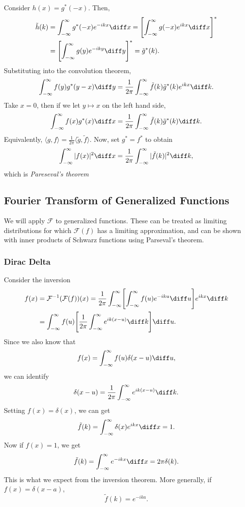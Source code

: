 \documentclass[12pt]{article}
\begin{document}
Consider $h(x) = g^{\ast}(-x)$. Then,
\begin{align*}
	\tilde h(k) &= \int_{-\infty}^{\infty} g^{\ast}(-x) e^{-ikx}\diff x = \Biggl[ \int_{-\infty}^{\infty} g(-x) e^{ikx} \diff x \Biggr]^{\ast} \\
		    &= \Biggl[ \int_{-\infty}^{\infty} g(y) e^{-iky} \diff y \Biggr]^{\ast} = \tilde g^{\ast}(k).
\end{align*}
Substituting into the convolution theorem,
\[
	\int_{-\infty}^{\infty} f(y) g^{\ast}(y - x) \diff y = \frac{1}{2\pi} \int_{-\infty}^{\infty} \tilde f(k) \tilde g^{\ast}(k) e^{ikx} \diff k
.\]
Take $x = 0$, then if we let $y \mapsto x$ on the left hand side,
\[
	\int_{-\infty}^{\infty}f(x) g^{\ast}(x) \diff x = \frac{1}{2\pi} \int_{-\infty}^{\infty} \tilde f(k) \tilde g^{\ast}(k) \diff k
.\]
Equivalently, $\langle g, f \rangle = \frac{1}{2\pi} \langle \tilde g, \tilde f \rangle$. Now, set $g^{\ast} = f^{\ast}$ to obtain
\[
	\int_{-\infty}^{\infty} |f(x)|^2 \diff x = \frac{1}{2\pi} \int_{-\infty}^{\infty} |\tilde f(k)|^2 \diff k
,\]
which is \textit{Pareseval's theorem}

\subsection{Fourier Transform of Generalized Functions}%
\label{sub:fourier_transform_of_generalized_functions}

We will apply $\mathcal{F}$ to generalized functions. These can be treated as limiting distributions for which $\mathcal{F}(f)$ has a limiting approximation, and can be shown with inner products of Schwarz functions using Parseval's theorem.

\subsubsection{Dirac Delta}%
\label{subsub:dirac_delta}

Consider the inversion
\begin{align*}
	f(x) &= \mathcal{F}^{-1}(\mathcal{F}(f))(x) = \frac{1}{2\pi} \int_{-\infty}^{\infty} \Biggl[ \int_{-\infty}^{\infty}f(u) e^{-iku} \diff u \Biggr] e^{ikx} \diff k \\
	     &= \int_{-\infty}^{\infty} f(u) \Biggl[ \frac{1}{2\pi} \int_{-\infty}^{\infty} e^{ik(x-u)}\diff k \Biggr] \diff u.
\end{align*}
Since we also know that
\[
	f(x) = \int_{-\infty}^{\infty}f(u) \delta(x - u) \diff u
,\]
we can identify
\[
	\delta(x - u) = \frac{1}{2\pi} \int_{-\infty}^{\infty}e^{ik(x - u)}\diff k
.\]
Setting $f(x) = \delta(x)$, we can get
\[
	\tilde f(k) = \int_{-\infty}^{\infty} \delta(x) e^{ikx} \diff x = 1
.\]
Now if $f(x) = 1$, we get
\[
	\tilde f(k) = \int_{-\infty}^{\infty} e^{-ikx} \diff x = 2 \pi \delta(k)
.\]
This is what we expect from the inversion theorem. More generally, if $f(x) = \delta(x - a)$,
\[
	\tilde f(k) = e^{-ika}
.\]
\end{document}
